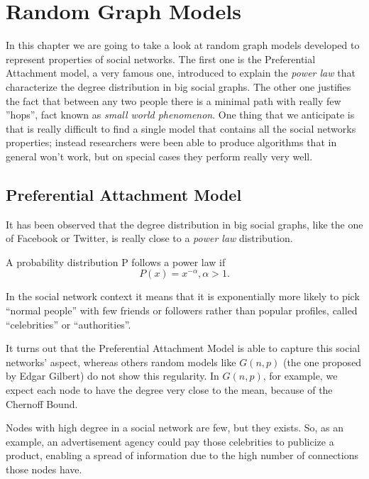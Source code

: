 \chapter{Random Graph Models}

In this chapter we are going to take a look at random graph models developed to represent properties of social networks. The first one is the Preferential Attachment model, a very famous one, introduced to explain the \emph{power law} that characterize the degree distribution in big social graphs. The other one justifies the fact that between any two people there is a minimal path with really few ''hops'', fact known as \emph{small world phenomenon}. One thing that we anticipate is that is really difficult to find a single model that contains all the social networks properties; instead researchers were been able to produce algorithms that in general won't work, but on special cases they perform really very well.

\section{Preferential Attachment Model}

It has been observed that the degree distribution in big social graphs, like the one of Facebook or Twitter, is really close to a \emph{power law} distribution.

\begin{defn}
	A probability distribution P follows a power law if
	\begin{equation}
		P(x) = x^{-\alpha}, \alpha > 1.
	\end{equation}
\end{defn}

In the social network context it means that it is exponentially more likely to pick ``normal people'' with few friends or followers rather than popular profiles, called ``celebrities'' or ``authorities''.

It turns out that the Preferential Attachment Model is able to capture this social networks' aspect, whereas others random models like $G(n,p)$ (the one proposed by Edgar Gilbert) do not show this regularity. In $G(n,p)$, for example, we expect each node to have the degree very close to the mean, because of the Chernoff Bound.

Nodes with high degree in a social network are few, but they exists. So, as an example, an advertisement agency could pay those celebrities to publicize a product, enabling a spread of information due to the high number of connections those nodes have.

